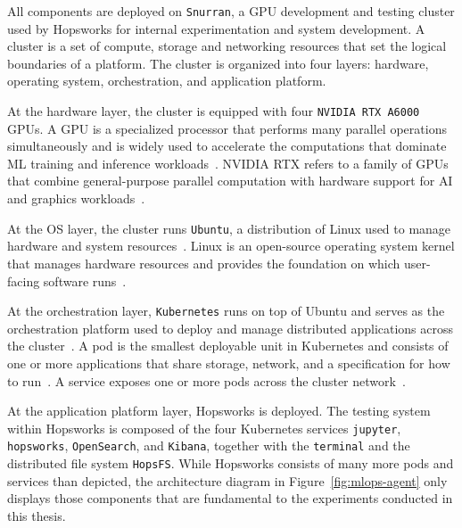 \documentclass[
english,                 %
bibtex,                  %
includeExtraAbstracts, %
]{kththesis}
\numberwithin{listing}{chapter}
\begin{document}
All components are deployed on \texttt{Snurran}, a \gls{GPU} development and testing cluster used by Hopsworks for internal experimentation and system development. A cluster is a set of compute, storage and networking resources that set the logical boundaries of a platform. The cluster is organized into four layers: hardware, operating system, orchestration, and application platform.

At the hardware layer, the cluster is equipped with four \texttt{NVIDIA \gls{RTX} A6000} \glspl{GPU}. A \gls{GPU} is a specialized processor that performs many parallel operations simultaneously and is widely used to accelerate the computations that dominate \gls{ML} training and inference workloads~\cite{harris_array_2020}. NVIDIA \gls{RTX} refers to a family of \glspl{GPU} that combine general-purpose parallel computation with hardware support for \gls{AI} and graphics workloads~\cite{nvidia_corporation_nvidia_2026}.

At the \gls{OS} layer, the cluster runs \texttt{Ubuntu}, a distribution of Linux used to manage hardware and system resources~\cite{canonical_ltd_enterprise_2026}. Linux is an open-source operating system kernel that manages hardware resources and provides the foundation on which user-facing software runs~\cite{torvalds_torvaldslinux_2026}.

At the orchestration layer, \texttt{Kubernetes} runs on top of Ubuntu and serves as the orchestration platform used to deploy and manage distributed applications across the cluster~\cite{the_kubernetes_authors_kuberneteskubernetes_2026}. A pod is the smallest deployable unit in Kubernetes and consists of one or more applications that share storage, network, and a specification for how to run~\cite{the_kubernetes_authors_pods_2026}. A service exposes one or more pods across the cluster network~\cite{the_kubernetes_authors_service_2026}.

At the application platform layer, Hopsworks is deployed. The testing system within Hopsworks is composed of the four Kubernetes services \texttt{jupyter}, \texttt{hopsworks}, \texttt{OpenSearch}, and \texttt{Kibana}, together with the \texttt{terminal} and the distributed file system \texttt{HopsFS}. While Hopsworks consists of many more pods and services than depicted, the architecture diagram in Figure~\ref{fig:mlops-agent} only displays those components that are fundamental to the experiments conducted in this thesis.
\end{document}

